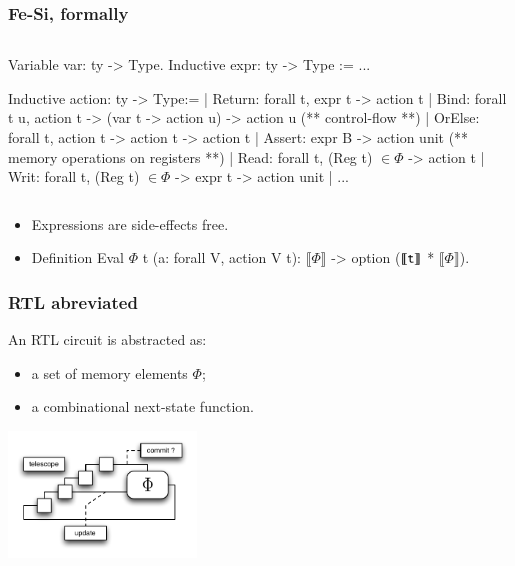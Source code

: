 \documentclass[9pt]{beamer}
\newcommand\denote[1]{\llbracket #1 \rrbracket}
\newcommand\fesi{Fe-Si}
\begin{document}
\begin{frame}[fragile]
  \frametitle{\fesi{}, formally}
  \begin{columns}

\begin{coq}
Variable var: ty -> Type. 
Inductive expr: ty -> Type := ...

Inductive action: ty -> Type:=
| Return: forall t, expr t -> action t
| Bind: forall t u,  action  t -> (var t -> action u) -> action u
(** control-flow **)
| OrElse: forall t, action t -> action t -> action t
| Assert: expr B -> action unit    
(** memory operations on registers **)
| Read: forall t, (Reg t) $\in \Phi$ -> action t
| Writ: forall t, (Reg t) $\in \Phi$ -> expr t -> action unit
| ... 
\end{coq}
    \end{columns}
\begin{itemize}
\item Expressions are side-effects free. 
\item \vspace{-.5em}
  \begin{coq}
Definition Eval $\Phi$ t (a: forall V, action V t): $\denote\Phi$ -> option ($\denote{\tt t}$ * $\denote\Phi$).
\end{coq}
\end{itemize}

\end{frame}

\begin{frame}[fragile]
  \frametitle{RTL abreviated}
  
  An RTL circuit is abstracted as:
  \begin{itemize}
  \item a set of memory elements $\Phi$;
  \item a combinational next-state function.
  \end{itemize}
  
  \begin{center}
    \includegraphics[width=5cm]{figs/rtl.pdf}  
  \end{center}

\end{frame}
\end{document}
